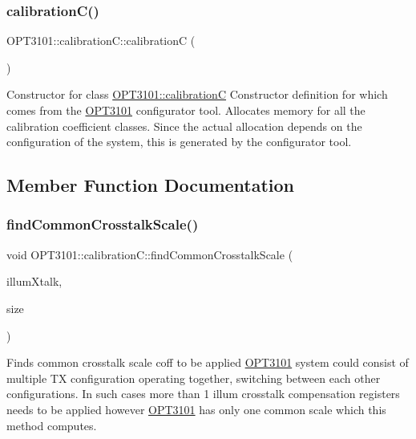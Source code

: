 \subsubsection{\texorpdfstring{calibration\+C()}{calibrationC()}\hspace{0.1cm}{\footnotesize\ttfamily [2/2]}}
{\footnotesize\ttfamily O\+P\+T3101\+::calibration\+C\+::calibrationC (\begin{DoxyParamCaption}{ }\end{DoxyParamCaption})}



Constructor for class \mbox{\hyperlink{class_o_p_t3101_1_1calibration_c}{O\+P\+T3101\+::calibrationC}} Constructor definition for which comes from the \mbox{\hyperlink{namespace_o_p_t3101}{O\+P\+T3101}} configurator tool. Allocates memory for all the calibration coefficient classes. Since the actual allocation depends on the configuration of the system, this is generated by the configurator tool. 



\subsection{Member Function Documentation}
\mbox{\label{class_o_p_t3101_1_1calibration_c_ae2c3f2786e65315d817b8953380e33b6}} 
\subsubsection{\texorpdfstring{find\+Common\+Crosstalk\+Scale()}{findCommonCrosstalkScale()}}
{\footnotesize\ttfamily void O\+P\+T3101\+::calibration\+C\+::find\+Common\+Crosstalk\+Scale (\begin{DoxyParamCaption}\item[{\mbox{\hyperlink{class_o_p_t3101_1_1crosstalk_c}{O\+P\+T3101\+::crosstalkC}} $\ast$}]{illum\+Xtalk,  }\item[{uint8\+\_\+t}]{size }\end{DoxyParamCaption})}



Finds common crosstalk scale coff to be applied \mbox{\hyperlink{namespace_o_p_t3101}{O\+P\+T3101}} system could consist of multiple TX configuration operating together, switching between each other configurations. In such cases more than 1 illum crosstalk compensation registers needs to be applied however \mbox{\hyperlink{namespace_o_p_t3101}{O\+P\+T3101}} has only one common scale which this method computes. 


